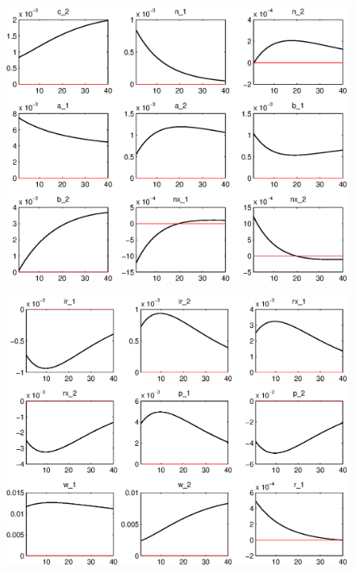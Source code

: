 \documentclass[11pt,a4paper]{article}
\begin{document}
\begin{figure}[H]
\begin{center}
\includegraphics[scale=0.8]{dsge2_IRF_eps_12.eps} 
\label{gdp_filter}
\end{center}
\end{figure}
\begin{figure}[H]
\begin{center}
\includegraphics[scale=0.8]{dsge2_IRF_eps_13.eps} 
\label{gdp_filter}
\end{center}
\end{figure}
\end{document}
